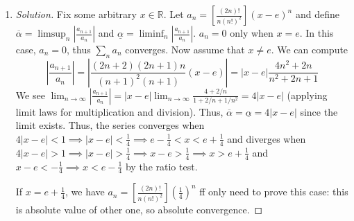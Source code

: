 \documentclass{article}
\newcommand{\R}{{\mathbb R}}
\begin{document}
\begin{enumerate}
\begin{proof}[Solution]
		Finally, if $x = 0$, $a_n = \frac{1}{\sqrt{n}}$,
		thus $\sum_n a_n$ diverges since this is a $p$-series
		where $p = \frac12 < 1$.
		
		In summary: the series converges when $x \in (-\infty,-\frac23] \cup (0,\infty)$.
	\end{proof}
	\item \begin{proof}[Solution]\let\qed\relax
		Fix some arbitrary $x \in \R$.
		Let $a_n = \left[\frac{(2n)!}{n(n!)^2}\right](x-e)^n$
		and define $\overline\alpha = \limsup_n \left|\frac{a_{n+1}}{a_n}\right|$
		and $\underline\alpha = \liminf_n \left|\frac{a_{n+1}}{a_n}\right|$.
		$a_n = 0$ only when $x = e$.
		In this case, $a_n = 0$, thus $\sum_n a_n$ converges.
		Now assume that $x \neq e$.
		We can compute
		\[
			\left\lvert \frac{a_{n+1}}{a_n}\right\rvert
			= \left\lvert \frac{(2n+2)(2n+1)n}{(n+1)^2(n+1)}(x-e)\right\rvert
			= |x-e| \frac{4n^2+2n}{n^2+2n+1}
		\]
		We see $\lim_{n\to\infty}\left\lvert \frac{a_{n+1}}{a_n}\right\rvert
		= |x-e|\lim_{n\to\infty}\frac{4+2/n}{1+2/n + 1/n^2} = 4|x-e|$
		(applying limit laws for multiplication and division).
		Thus, $\overline\alpha = \underline\alpha = 4|x-e|$
		since the limit exists.
		Thus, the series converges when $4|x-e| < 1 \implies |x-e| < \frac14
		\implies e-\frac14 < x < e + \frac14$ and diverges when $4|x-e| > 1 \implies |x-e| > \frac14 \implies
		x-e > \frac14 \implies x > e + \frac14$ and $x-e < -\frac14
		\implies x < e - \frac14$ by the ratio test.

		If $x = e + \frac14$, we have
		$a_n = \left[\frac{(2n)!}{n(n!)^2}\right]\left(\frac{1}{4}\right)^n$
		ff
		only need to prove this case: this is absolute value of other one,
		so absolute convergence.
	\end{proof}
\end{enumerate}
\clearpage
\end{document}
